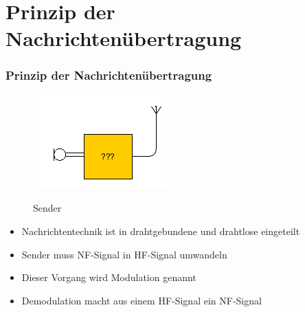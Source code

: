 

\subtitle{Technik Klasse E 14: \\
  Modulation \& Demodulation \\[2em]}
\date{Stand 18.09.2017}


\section*{Prinzip der Nachrichtenübertragung}
\begin{frame}
  \frametitle{Prinzip der Nachrichtenübertragung}
  \begin{center}
    \begin{figure}
      \includegraphics[width=\textwidth,height=.45\textheight,keepaspectratio]{e14/Sender.png}\\
      \caption{Sender}
    \end{figure}
  \end{center}
  \begin{itemize}
    \item Nachrichtentechnik ist in drahtgebundene und drahtlose eingeteilt
    \item Sender muss NF-Signal in HF-Signal umwandeln
    \item Dieser Vorgang wird Modulation genannt
    \item Demodulation macht aus einem HF-Signal ein NF-Signal
  \end{itemize}
\end{frame}

